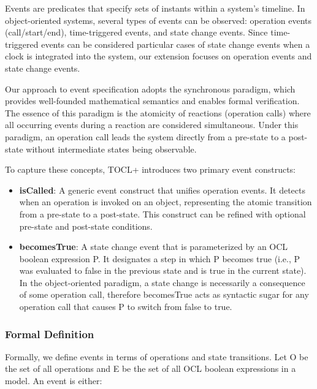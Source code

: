 \hspace{1cm} Events are predicates that specify sets of instants within a system's 
timeline. In object-oriented systems, several types of events can be observed: 
operation events (call/start/end), time-triggered events, and state change events. 
Since time-triggered events can be considered particular cases of state change events 
when a clock is integrated into the system, our extension focuses on operation events 
and state change events.

Our approach to event specification adopts the synchronous paradigm, which provides 
well-founded mathematical semantics and enables formal verification. The essence 
of this paradigm is the atomicity of reactions (operation calls) where all occurring 
events during a reaction are considered simultaneous. Under this paradigm, an 
operation call leads the system directly from a pre-state to a post-state without 
intermediate states being observable.

To capture these concepts, TOCL+ introduces two primary event constructs:

\begin{itemize}
    \item \textbf{isCalled}: A generic event construct that unifies operation events. It detects when an operation is invoked on an object, representing the atomic transition from a pre-state to a post-state. This construct can be refined with optional pre-state and post-state conditions.
    
    \item \textbf{becomesTrue}: A state change event that is parameterized by an OCL boolean expression P. It designates a step in which P becomes true (i.e., P was evaluated to false in the previous state and is true in the current state). In the object-oriented paradigm, a state change is necessarily a consequence of some operation call, therefore becomesTrue acts as syntactic sugar for any operation call that causes P to switch from false to true.
\end{itemize}

\subsubsection{Formal Definition}

Formally, we define events in terms of operations and state transitions. Let O be the set of all operations and E be the set of all OCL boolean expressions in a model. An event is either:

